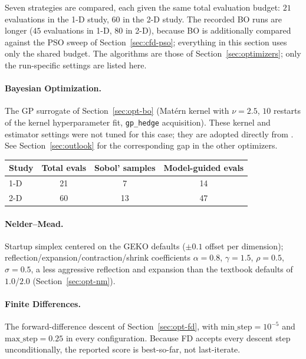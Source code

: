 Seven strategies are compared, each given the same total evaluation budget:
$21$ evaluations in the 1-D study, $60$ in the 2-D study.  The recorded BO
runs are longer ($45$ evaluations in 1-D, $80$ in 2-D), because BO is
additionally compared against the PSO sweep of Section~\ref{sec:cfd-pso};
everything in this section uses only the shared budget.  The algorithms are
those of Section~\ref{sec:optimizers}; only the run-specific settings are
listed here.

\paragraph{Bayesian Optimization.} The GP surrogate of
Section~\ref{sec:opt-bo} (Mat\'ern kernel with $\nu=2.5$, $10$ restarts of
the kernel hyperparameter fit, \texttt{gp\_hedge} acquisition).  These
kernel and estimator settings were not tuned for this case; they are
adopted directly from \cite{bo_hyperparams_ref}.  See
Section~\ref{sec:outlook} for the corresponding gap in the other
optimizers.

\begin{center}
\begin{tabular}{@{}lccc@{}}
\toprule
Study & Total evals & Sobol' samples & Model-guided evals \\
\midrule
1-D & 21 & 7  & 14 \\
2-D & 60 & 13 & 47 \\
\bottomrule
\end{tabular}
\end{center}

\paragraph{Nelder--Mead.} Startup simplex centered on the GEKO defaults
($\pm 0.1$ offset per dimension);
reflection/expansion/contraction/shrink coefficients $\alpha=0.8$,
$\gamma=1.5$, $\rho=0.5$, $\sigma=0.5$, a less aggressive reflection and
expansion than the textbook defaults of $1.0$/$2.0$
(Section~\ref{sec:opt-nm}).

\paragraph{Finite Differences.} The forward-difference descent of
Section~\ref{sec:opt-fd}, with $\text{min\_step}=10^{-5}$ and
$\text{max\_step}=0.25$ in every configuration.  Because FD accepts every
descent step unconditionally, the reported score is best-so-far, not
last-iterate.

